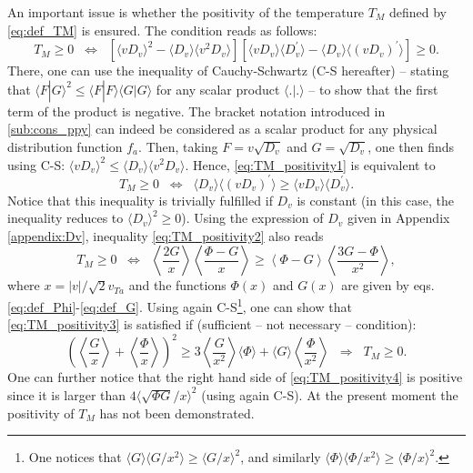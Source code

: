 \documentclass[11pt]{article}
\begin{document}
An important issue is whether the positivity of the temperature $T_M$ defined by \cref{eq:def_TM} is ensured. 
The condition reads as follows:
%
\begin{equation} \label{eq:TM_positivity1}
T_M \geq 0 \;\; \Leftrightarrow \;\;
\left[\langle vD_v \rangle^2 - \langle D_v \rangle\langle v^2D_v \rangle \right]
\left[\langle vD_v \rangle\langle D_v^\prime \rangle-\langle D_v \rangle\langle (v D_v)^\prime \rangle\right] \geq0.
\end{equation}
%
There, one can use the inequality of Cauchy-Schwartz (C-S hereafter) -- stating that $\langle F|G \rangle^2 \leq \langle F|F \rangle \langle G|G \rangle$ for any scalar product $\langle .|. \rangle$ -- to show that the first term of the product is negative. The bracket notation introduced in \cref{sub:cons_ppy} can indeed be considered as a scalar product for any physical distribution function $f_a$. Then, taking $F=v\sqrt{D_v}$ and $G=\sqrt{D_v}$, one then finds using C-S: $\langle vD_v \rangle^2 \leq \langle D_v \rangle\langle v^2D_v \rangle$. Hence, \cref{eq:TM_positivity1} is equivalent to
%
\begin{equation} \label{eq:TM_positivity2}
T_M \geq 0 \;\; \Leftrightarrow \;\;
\langle D_v \rangle\langle (v D_v)^\prime \rangle
\geq
\langle vD_v \rangle\langle D_v^\prime \rangle.
\end{equation}
%
Notice that this inequality is trivially fulfilled if $D_v$ is constant (in this case, the inequality reduces to $\langle D_v \rangle^2 \geq 0$).
Using the expression of $D_v$ given in Appendix \ref{appendix:Dv}, inequality \eqref{eq:TM_positivity2} also reads
%
\begin{equation} \label{eq:TM_positivity3}
T_M \geq 0 \;\; \Leftrightarrow \;\;
\left\langle \frac{2G}{x} \right\rangle \left\langle \frac{\Phi-G}{x} \right\rangle 
\geq
\left\langle \Phi-G \right\rangle \left\langle \frac{3G-\Phi}{x^2} \right\rangle ,
\end{equation}
%
where $x = |v|/\sqrt{2}v_{Ta}$ and the functions $\Phi(x)$ and $G(x)$ are given by eqs.\,\eqref{eq:def_Phi}-\eqref{eq:def_G}. Using again C-S\footnote{One notices that $\langle G\rangle \langle G/x^2\rangle \geq \langle G/x\rangle^2$, and similarly $\langle \Phi\rangle \langle \Phi/x^2\rangle \geq \langle \Phi/x\rangle^2$.}, one can show that \cref{eq:TM_positivity3} is satisfied if (sufficient -- not necessary -- condition):
%
\begin{equation} \label{eq:TM_positivity4}
\left(\left\langle \frac{G}{x} \right\rangle + \left\langle \frac{\Phi}{x} \right\rangle \right)^2
\geq
3\left\langle \frac{G}{x^2} \right\rangle \langle \Phi \rangle
+ \langle G \rangle \left\langle \frac{\Phi}{x^2} \right\rangle
\;\; \Rightarrow \;\; T_M \geq 0 .
\end{equation}
%
One can further notice that the right hand side of \cref{eq:TM_positivity4} is positive since it is larger than $4\langle \sqrt{\Phi G}/x \rangle^2$ (using again C-S). At the present moment the positivity of $T_M$ has not been demonstrated.
\end{document}
